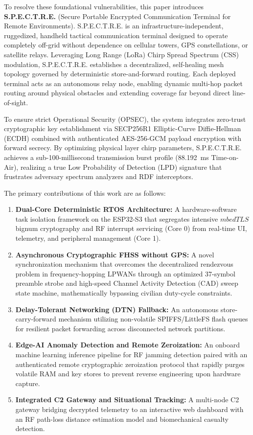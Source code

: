 \documentclass[conference]{IEEEtran}
\begin{document}
To resolve these foundational vulnerabilities, this paper introduces \textbf{S.P.E.C.T.R.E.} (Secure Portable Encrypted Communication Terminal for Remote Environments). S.P.E.C.T.R.E. is an infrastructure-independent, ruggedized, handheld tactical communication terminal designed to operate completely off-grid without dependence on cellular towers, GPS constellations, or satellite relays. Leveraging Long Range (LoRa) Chirp Spread Spectrum (CSS) modulation, S.P.E.C.T.R.E. establishes a decentralized, self-healing mesh topology governed by deterministic store-and-forward routing. Each deployed terminal acts as an autonomous relay node, enabling dynamic multi-hop packet routing around physical obstacles and extending coverage far beyond direct line-of-sight.

To ensure strict Operational Security (OPSEC), the system integrates zero-trust cryptographic key establishment via SECP256R1 Elliptic-Curve Diffie-Hellman (ECDH) combined with authenticated AES-256-GCM payload encryption with forward secrecy. By optimizing physical layer chirp parameters, S.P.E.C.T.R.E. achieves a sub-100-millisecond transmission burst profile (88.192~ms Time-on-Air), realizing a true Low Probability of Detection (LPD) signature that frustrates adversary spectrum analyzers and RDF interceptors.

The primary contributions of this work are as follows:
\begin{enumerate}
    \item \textbf{Dual-Core Deterministic RTOS Architecture:} A hardware-software task isolation framework on the ESP32-S3 that segregates intensive $mbedTLS$ bignum cryptography and RF interrupt servicing (Core 0) from real-time UI, telemetry, and peripheral management (Core 1).
    \item \textbf{Asynchronous Cryptographic FHSS without GPS:} A novel synchronization mechanism that overcomes the decentralized rendezvous problem in frequency-hopping LPWANs through an optimized 37-symbol preamble strobe and high-speed Channel Activity Detection (CAD) sweep state machine, mathematically bypassing civilian duty-cycle constraints.
    \item \textbf{Delay-Tolerant Networking (DTN) Fallback:} An autonomous store-carry-forward mechanism utilizing non-volatile SPIFFS/LittleFS flash queues for resilient packet forwarding across disconnected network partitions.
    \item \textbf{Edge-AI Anomaly Detection and Remote Zeroization:} An onboard machine learning inference pipeline for RF jamming detection paired with an authenticated remote cryptographic zeroization protocol that rapidly purges volatile RAM and key stores to prevent reverse engineering upon hardware capture.
    \item \textbf{Integrated C2 Gateway and Situational Tracking:} A multi-node C2 gateway bridging decrypted telemetry to an interactive web dashboard with an RF path-loss distance estimation model and biomechanical casualty detection.
\end{enumerate}
\end{document}
